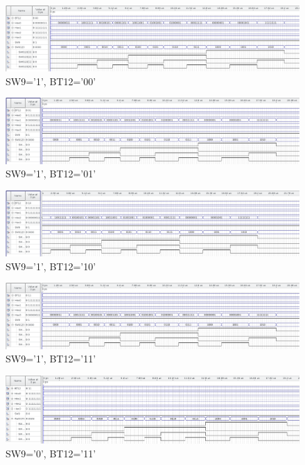 \documentclass{classrep}
\begin{document}
\begin{figure}[H]
	\centering
	\includegraphics[width=1.0\linewidth]{symhex0}
	\caption{SW9='1', BT12='00'}
	\label{fig:symhex0}
\end{figure}
\begin{figure}[H]
	\centering
	\includegraphics[width=1.0\linewidth]{symhex1}
	\caption{SW9='1', BT12='01'}
	\label{fig:symhex1}
\end{figure}

\begin{figure}[H]
	\centering
	\includegraphics[width=1.0\linewidth]{symhex2}
	\caption{SW9='1', BT12='10'}
	\label{fig:symhex2}
\end{figure}

\begin{figure}[H]
	\centering
	\includegraphics[width=1.0\linewidth]{symhex3}
	\caption{SW9='1', BT12='11'}
	\label{fig:symhex3}
\end{figure}

\begin{figure}[H]
	\centering
	\includegraphics[width=1.0\linewidth]{symhex3not_oe}
	\caption{SW9='0', BT12='11'}
	\label{fig:symhex3not_oe}
\end{figure}
\end{document}
